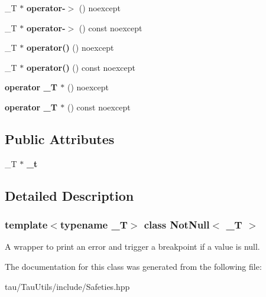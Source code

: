 \begin{DoxyCompactItemize}
\+\_\+T $\ast$ {\bfseries operator-\/$>$} () noexcept
\item 
\mbox{\label{class_not_null_a251325b0c267e160e27a1e91a9d78474}} 
\+\_\+T $\ast$ {\bfseries operator-\/$>$} () const noexcept
\item 
\mbox{\label{class_not_null_a80b0753670061906773ac549db8d178e}} 
\+\_\+T $\ast$ {\bfseries operator()} () noexcept
\item 
\mbox{\label{class_not_null_aa03cff48b0bbdb4e42847bb324ea48dd}} 
\+\_\+T $\ast$ {\bfseries operator()} () const noexcept
\item 
\mbox{\label{class_not_null_a2ede1e0c6322802b2b3db02075700618}} 
{\bfseries operator \+\_\+\+T $\ast$} () noexcept
\item 
\mbox{\label{class_not_null_a8f78e7f813813d1ba836b1f050a59a03}} 
{\bfseries operator \+\_\+\+T $\ast$} () const noexcept
\end{DoxyCompactItemize}
\subsection*{Public Attributes}
\begin{DoxyCompactItemize}
\item 
\mbox{\label{class_not_null_a6fb57bf2755aba617fa008802f084593}} 
\+\_\+T $\ast$ {\bfseries \+\_\+t}
\end{DoxyCompactItemize}


\subsection{Detailed Description}
\subsubsection*{template$<$typename \+\_\+T$>$\newline
class Not\+Null$<$ \+\_\+\+T $>$}

A wrapper to print an error and trigger a breakpoint if a value is null. 

The documentation for this class was generated from the following file\+:\begin{DoxyCompactItemize}
\item 
tau/\+Tau\+Utils/include/Safeties.\+hpp\end{DoxyCompactItemize}
